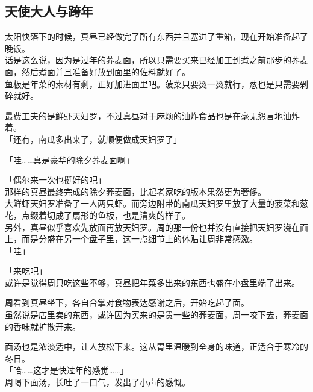 \subsection{天使大人与跨年}

太阳快落下的时候，真昼已经做完了所有东西并且塞进了重箱，现在开始准备起了晚饭。\\

话是这么说，因为是过年的荞麦面，所以只需要买来已经加工到煮之前那步的荞麦面，然后煮面并且准备好放到面里的佐料就好了。\\

鱼板是年菜的素材有剩，正好加进面里吧。菠菜只要烫一烫就行，葱也是只需要剁碎就好。

最费工夫的是鲜虾天妇罗，不过真昼对于麻烦的油炸食品也是在毫无怨言地油炸着。\\

「还有，南瓜多出来了，就顺便做成天妇罗了」

「哇……真是豪华的除夕荞麦面啊」

「偶尔来一次也挺好的吧」\\

那样的真昼最终完成的除夕荞麦面，比起老家吃的版本果然更为奢侈。\\

大鲜虾天妇罗准备了一人两只虾。而旁边附带的南瓜天妇罗里放了大量的菠菜和葱花，点缀着切成了扇形的鱼板，也是清爽的样子。\\

另外，真昼似乎喜欢先放面再放天妇罗。周的那一份也并没有直接把天妇罗浇在面上，而是分盛在另一个盘子里，这一点细节上的体贴让周非常感激。\\

「哇」

「来吃吧」\\

或许是觉得周只吃这些不够，真昼把年菜多出来的东西也盛在小盘里端了出来。

周看到真昼坐下，各自合掌对食物表达感谢之后，开始吃起了面。\\

虽然说是店里卖的东西，或许因为买来的是贵一些的荞麦面，周一咬下去，荞麦面的香味就扩散开来。

面汤也是浓淡适中，让人放松下来。这从胃里温暖到全身的味道，正适合于寒冷的冬日。\\

「哈……这才是快过年的感觉……」\\

周喝下面汤，长吐了一口气，发出了小声的感慨。\\

